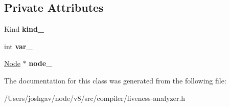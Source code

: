\subsection*{Private Attributes}
\begin{DoxyCompactItemize}
\item 
Kind {\bfseries kind\+\_\+}\hypertarget{classv8_1_1internal_1_1compiler_1_1_liveness_analyzer_block_1_1_entry_af58d2b9735198c1747351702657c73cd}{}\label{classv8_1_1internal_1_1compiler_1_1_liveness_analyzer_block_1_1_entry_af58d2b9735198c1747351702657c73cd}

\item 
int {\bfseries var\+\_\+}\hypertarget{classv8_1_1internal_1_1compiler_1_1_liveness_analyzer_block_1_1_entry_a8c70b3792d8943726554efa340f27605}{}\label{classv8_1_1internal_1_1compiler_1_1_liveness_analyzer_block_1_1_entry_a8c70b3792d8943726554efa340f27605}

\item 
\hyperlink{classv8_1_1internal_1_1compiler_1_1_node}{Node} $\ast$ {\bfseries node\+\_\+}\hypertarget{classv8_1_1internal_1_1compiler_1_1_liveness_analyzer_block_1_1_entry_a0ecf517468deabfc252c3b9a9deab804}{}\label{classv8_1_1internal_1_1compiler_1_1_liveness_analyzer_block_1_1_entry_a0ecf517468deabfc252c3b9a9deab804}

\end{DoxyCompactItemize}


The documentation for this class was generated from the following file\+:\begin{DoxyCompactItemize}
\item 
/\+Users/joshgav/node/v8/src/compiler/liveness-\/analyzer.\+h\end{DoxyCompactItemize}

